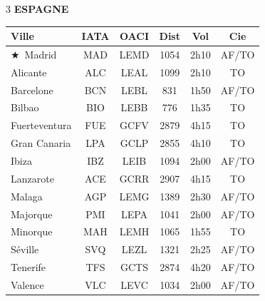 \documentclass[9pt,a4paper,landscape]{article}
\newcommand{\CAP}{\textcolor{capgold}{$\bigstar$}}
\begin{document}
\begin{multicols}{3}
\vspace{0.15cm}
\textbf{\color{eurblue}ESPAGNE}\\[-0.1cm]
\begin{tabular}{@{}l c c c c c@{}}
\toprule
\textbf{Ville} & \textbf{IATA} & \textbf{OACI} & \textbf{Dist} & \textbf{Vol} & \textbf{Cie} \\
\midrule
\rowcolor{eurlight}\CAP\ Madrid & MAD & LEMD & 1054 & 2h10 & AF/TO \\
Alicante & ALC & LEAL & 1099 & 2h10 & TO \\
\rowcolor{eurlight} Barcelone & BCN & LEBL & 831 & 1h50 & AF/TO \\
Bilbao & BIO & LEBB & 776 & 1h35 & TO \\
\rowcolor{eurlight} Fuerteventura & FUE & GCFV & 2879 & 4h15 & TO \\
Gran Canaria & LPA & GCLP & 2855 & 4h10 & TO \\
\rowcolor{eurlight} Ibiza & IBZ & LEIB & 1094 & 2h00 & AF/TO \\
Lanzarote & ACE & GCRR & 2907 & 4h15 & TO \\
\rowcolor{eurlight} Malaga & AGP & LEMG & 1389 & 2h30 & AF/TO \\
Majorque & PMI & LEPA & 1041 & 2h00 & AF/TO \\
\rowcolor{eurlight} Minorque & MAH & LEMH & 1065 & 1h55 & TO \\
Séville & SVQ & LEZL & 1321 & 2h25 & AF/TO \\
\rowcolor{eurlight} Tenerife & TFS & GCTS & 2874 & 4h20 & AF/TO \\
Valence & VLC & LEVC & 1034 & 2h00 & AF/TO \\
\bottomrule
\end{tabular}


\end{multicols}
\end{document}
